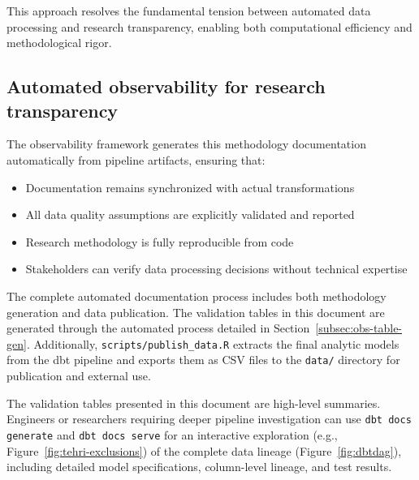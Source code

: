 \documentclass{article}
\begin{document}
This approach resolves the fundamental tension between automated data processing and research transparency, enabling both computational efficiency and methodological rigor.

\subsection{Automated observability for research transparency}

The observability framework generates this methodology documentation automatically from pipeline artifacts, ensuring that:
\begin{itemize}
    \item Documentation remains synchronized with actual transformations
    \item All data quality assumptions are explicitly validated and reported
    \item Research methodology is fully reproducible from code
    \item Stakeholders can verify data processing decisions without technical expertise
\end{itemize}

The complete automated documentation process includes both methodology generation and data publication. The validation tables in this document are generated through the automated process detailed in Section~\ref{subsec:obs-table-gen}. Additionally, \texttt{scripts/publish\_data.R} extracts the final analytic models from the dbt pipeline and exports them as CSV files to the \texttt{data/} directory for publication and external use.

The validation tables presented in this document are high-level summaries. Engineers or researchers requiring deeper pipeline investigation can use \texttt{dbt docs generate} and \texttt{dbt docs serve} for an interactive exploration (e.g., Figure~\ref{fig:tehri-exclusions}) of the complete data lineage (Figure~\ref{fig:dbtdag}), including detailed model specifications, column-level lineage, and test results. 
\end{document}
